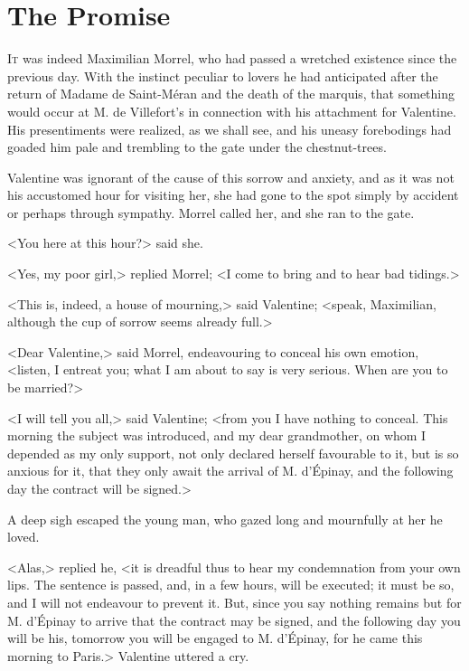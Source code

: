 \chapter{The Promise} 

 \lettrine{I}{t} was indeed Maximilian Morrel, who had passed a wretched existence since the previous day. With the instinct peculiar to lovers he had anticipated after the return of Madame de Saint-Méran and the death of the marquis, that something would occur at M. de Villefort's in connection with his attachment for Valentine. His presentiments were realized, as we shall see, and his uneasy forebodings had goaded him pale and trembling to the gate under the chestnut-trees. 

 Valentine was ignorant of the cause of this sorrow and anxiety, and as it was not his accustomed hour for visiting her, she had gone to the spot simply by accident or perhaps through sympathy. Morrel called her, and she ran to the gate. 

 <You here at this hour?> said she. 

 <Yes, my poor girl,> replied Morrel; <I come to bring and to hear bad tidings.> 

 <This is, indeed, a house of mourning,> said Valentine; <speak, Maximilian, although the cup of sorrow seems already full.> 

 <Dear Valentine,> said Morrel, endeavouring to conceal his own emotion, <listen, I entreat you; what I am about to say is very serious. When are you to be married?> 

 <I will tell you all,> said Valentine; <from you I have nothing to conceal. This morning the subject was introduced, and my dear grandmother, on whom I depended as my only support, not only declared herself favourable to it, but is so anxious for it, that they only await the arrival of M. d'Épinay, and the following day the contract will be signed.> 

 A deep sigh escaped the young man, who gazed long and mournfully at her he loved. 

 <Alas,> replied he, <it is dreadful thus to hear my condemnation from your own lips. The sentence is passed, and, in a few hours, will be executed; it must be so, and I will not endeavour to prevent it. But, since you say nothing remains but for M. d'Épinay to arrive that the contract may be signed, and the following day you will be his, tomorrow you will be engaged to M. d'Épinay, for he came this morning to Paris.> Valentine uttered a cry. 

